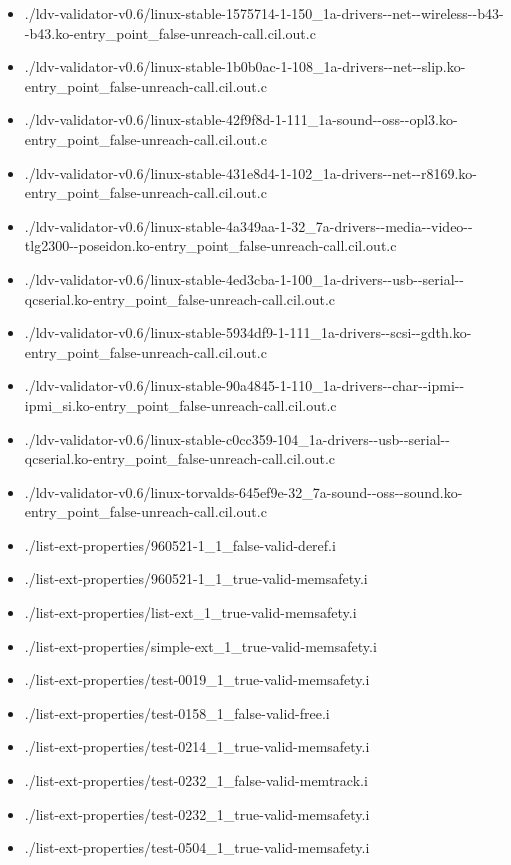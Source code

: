 \documentclass[envcountsame]{llncs}
\begin{document}
\begin{itemize}
\item ./ldv-validator-v0.6/linux-stable-1575714-1-150\_1a-drivers-{}-net-{}-wireless-{}-b43-{}-b43.ko-entry\_point\_false-unreach-call.cil.out.c
\item ./ldv-validator-v0.6/linux-stable-1b0b0ac-1-108\_1a-drivers-{}-net-{}-slip.ko-entry\_point\_false-unreach-call.cil.out.c
\item ./ldv-validator-v0.6/linux-stable-42f9f8d-1-111\_1a-sound-{}-oss-{}-opl3.ko-entry\_point\_false-unreach-call.cil.out.c
\item ./ldv-validator-v0.6/linux-stable-431e8d4-1-102\_1a-drivers-{}-net-{}-r8169.ko-entry\_point\_false-unreach-call.cil.out.c
\item ./ldv-validator-v0.6/linux-stable-4a349aa-1-32\_7a-drivers-{}-media-{}-video-{}-tlg2300-{}-poseidon.ko-entry\_point\_false-unreach-call.cil.out.c
\item ./ldv-validator-v0.6/linux-stable-4ed3cba-1-100\_1a-drivers-{}-usb-{}-serial-{}-qcserial.ko-entry\_point\_false-unreach-call.cil.out.c
\item ./ldv-validator-v0.6/linux-stable-5934df9-1-111\_1a-drivers-{}-scsi-{}-gdth.ko-entry\_point\_false-unreach-call.cil.out.c
\item ./ldv-validator-v0.6/linux-stable-90a4845-1-110\_1a-drivers-{}-char-{}-ipmi-{}-ipmi\_si.ko-entry\_point\_false-unreach-call.cil.out.c
\item ./ldv-validator-v0.6/linux-stable-c0cc359-104\_1a-drivers-{}-usb-{}-serial-{}-qcserial.ko-entry\_point\_false-unreach-call.cil.out.c
\item ./ldv-validator-v0.6/linux-torvalds-645ef9e-32\_7a-sound-{}-oss-{}-sound.ko-entry\_point\_false-unreach-call.cil.out.c


\item ./list-ext-properties/960521-1\_1\_false-valid-deref.i
\item ./list-ext-properties/960521-1\_1\_true-valid-memsafety.i
\item ./list-ext-properties/list-ext\_1\_true-valid-memsafety.i
\item ./list-ext-properties/simple-ext\_1\_true-valid-memsafety.i
\item ./list-ext-properties/test-0019\_1\_true-valid-memsafety.i
\item ./list-ext-properties/test-0158\_1\_false-valid-free.i
\item ./list-ext-properties/test-0214\_1\_true-valid-memsafety.i
\item ./list-ext-properties/test-0232\_1\_false-valid-memtrack.i
\item ./list-ext-properties/test-0232\_1\_true-valid-memsafety.i
\item ./list-ext-properties/test-0504\_1\_true-valid-memsafety.i



\end{itemize}
\end{document}
